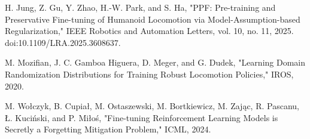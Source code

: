 \documentclass[letterpaper,10pt,conference]{ieeeconf}
\begin{document}
\noindent [17] H. Jung, Z. Gu, Y. Zhao, H.-W. Park, and S. Ha, "PPF: Pre-training and Preservative Fine-tuning of Humanoid Locomotion via Model-Assumption-based Regularization," IEEE Robotics and Automation Letters, vol. 10, no. 11, 2025. doi:10.1109/LRA.2025.3608637.\par\medskip

\noindent [18] M. Mozifian, J. C. Gamboa Higuera, D. Meger, and G. Dudek, "Learning Domain Randomization Distributions for Training Robust Locomotion Policies," IROS, 2020.\par\medskip


\noindent [19] M. Wołczyk, B. Cupiał, M. Ostaszewski, M. Bortkiewicz, M. Zając, R. Pascanu, Ł. Kuciński, and P. Miłoś, "Fine-tuning Reinforcement Learning Models is Secretly a Forgetting Mitigation Problem," ICML, 2024.\par\medskip
\end{document}
